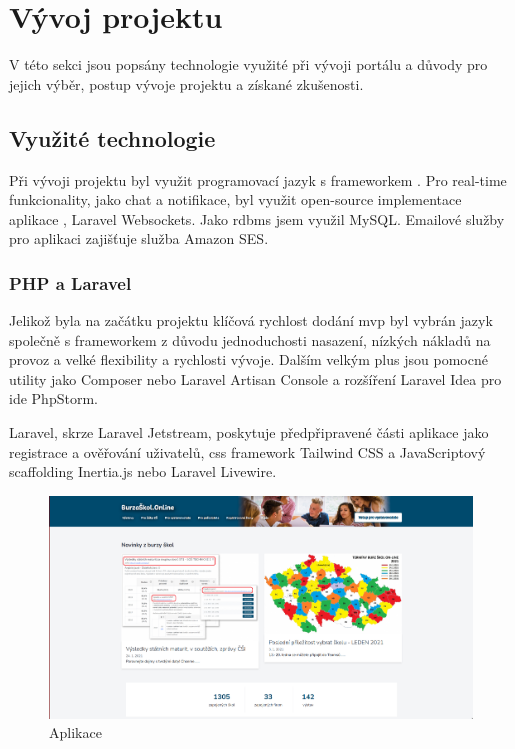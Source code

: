 \section{Vývoj projektu}

V této sekci jsou popsány technologie využité při vývoji portálu \bso a důvody pro jejich výběr, postup vývoje projektu a získané zkušenosti.

\subsection{Využité technologie}
\label{sub:used-technologies}

Při vývoji projektu byl využit programovací jazyk  s \gls{framework}em  . Pro \gls{real-time} funkcionality, jako chat a notifikace, byl využit \gls{open-source} implementace aplikace , Laravel Websockets\cite{laravel-websockets}. Jako \acrshort{rdbms} jsem využil MySQL\cite{mysql}. Emailové služby pro aplikaci zajišťuje služba Amazon SES\cite{amazon-ses}.

\subsubsection{PHP a Laravel}

Jelikož byla na začátku projektu \bso klíčová rychlost dodání \gls{mvp} byl vybrán jazyk  společně s \gls{framework}em  z důvodu jednoduchosti nasazení, nízkých nákladů na provoz a velké flexibility a rychlosti vývoje. Dalším velkým plus jsou pomocné utility jako Composer\cite{composer} nebo Laravel Artisan Console\cite{laravel-artisan} a rozšíření Laravel Idea\cite{laravel-idea} pro \acrshort{ide} PhpStorm\cite{phpstorm}.

Laravel, skrze Laravel Jetstream\cite{laravel-jetstream}, poskytuje předpřipravené části aplikace jako registrace a ověřování uživatelů, \acrshort{css} \gls{framework} Tailwind CSS\cite{tailwind-css} a JavaScriptový \gls{scaffolding} Inertia.js\cite{inertia-js} nebo Laravel Livewire\cite{laravel-livewire}.

\begin{figure}[h]
\centering
\includegraphics[width=\textwidth]{img/burzaskol-online.png}
\caption{Aplikace \bso}
\label{fig:burzaskol-online-2020}
\end{figure}

